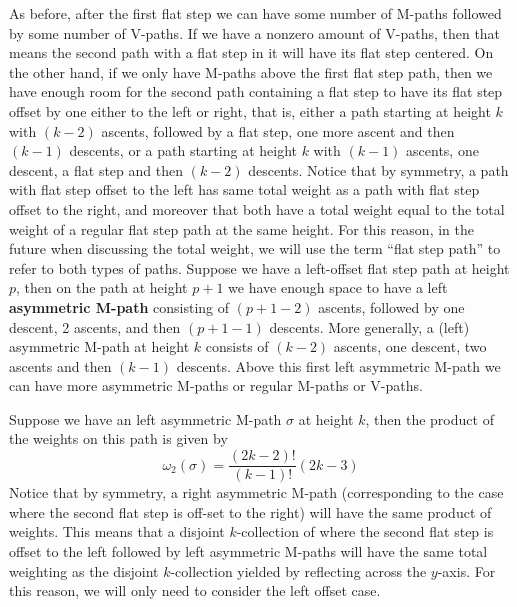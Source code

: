 \documentclass[11pt]{article}
\theoremstyle{mythm}
\begin{document}
As before, after the first flat step we can have some number of M-paths followed by some number of V-paths. If we have a nonzero amount of V-paths, then that means the second path with a flat step in it will have its flat step centered. On the other hand, if we only have M-paths above the first flat step path, then we have enough room for the second path containing a flat step to have its flat step offset by one either to the left or right, that is, either a path starting at height $k$ with $(k-2)$ ascents, followed by a flat step, one more ascent and then $(k-1)$ descents, or a path starting at height $k$ with $(k-1)$ ascents, one descent, a flat step and then $(k-2)$ descents. Notice that by symmetry, a path with flat step offset to the left has same total weight as a path with flat step offset to the right, and moreover that both have a total weight  equal to the total weight of a regular flat step path at the same height. For this reason, in the future when discussing the total weight, we will use the term ``flat step path'' to refer to both types of paths. Suppose we have a left-offset flat step path at height $p$, then on the path at height $p+1$ we have enough space to have a left \textbf{asymmetric M-path} consisting of $(p+1-2)$ ascents, followed by one descent, 2 ascents, and then $(p+1-1)$ descents. More generally, a (left) asymmetric M-path at height $k$ consists of $(k-2)$ ascents, one descent, two ascents and then $(k-1)$ descents. Above this first left asymmetric M-path we can have more asymmetric M-paths or regular M-paths or V-paths.

Suppose we have an left asymmetric M-path $\sigma$ at height $k$, then the product of the weights on this path is given by
\begin{equation*}
\omega_2(\sigma) = \frac{(2k-2)!}{(k-1)!}(2k-3)
\end{equation*}
Notice that by symmetry, a right asymmetric M-path (corresponding to the case where the second flat step is off-set to the right) will have the same product of weights. This means that a disjoint $k$-collection of where the second flat step is offset to the left followed by left asymmetric M-paths will have the same total weighting as the disjoint $k$-collection yielded by reflecting across the $y$-axis. For this reason, we will only need to consider the left offset case.
\end{document}
